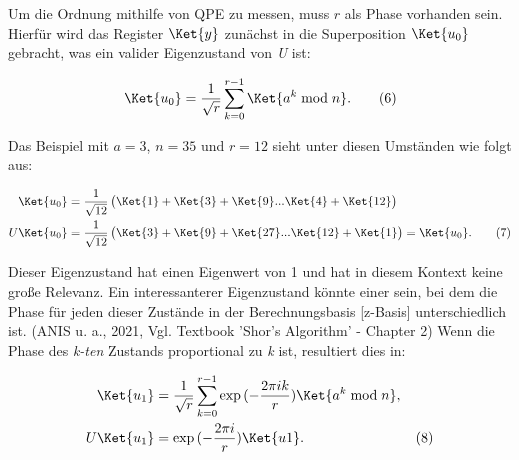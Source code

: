 	\newline \newline
\newline \newline

	Um die Ordnung mithilfe von QPE zu messen, muss \(r\) als Phase vorhanden sein. Hierfür wird das Register \(\Ket{y}\) zunächst in die Superposition \(\Ket{u_0}\) gebracht, was ein valider Eigenzustand von \textit{U} ist:

	\begin{gather*}
	    \Ket{u_0} = \frac{1}{\sqrt{r}} \sum_{k=0}^{r-1} \Ket{a^k \bmod{n}} .  \quad \quad (6)
	\end{gather*}

	Das Beispiel mit \(a=3\), \(n=35\) und \(r=12\) sieht unter diesen Umständen wie folgt aus:

	\begin{align*}
	    \Ket{u_0} &= \frac{1}{\sqrt{12}} \begin{pmatrix}\Ket{1} + \Ket{3} + \Ket{9} ... \Ket{4} + \Ket{12}\end{pmatrix} \\
	    U\Ket{u_0} &= \frac{1}{\sqrt{12}} \begin{pmatrix}\Ket{3} + \Ket{9} + \Ket{27} ... \Ket{12} + \Ket{1}\end{pmatrix} = \Ket{u_0}.  \quad \quad (7)
	\end{align*}


	Dieser Eigenzustand hat einen Eigenwert von 1 und hat in diesem Kontext keine große Relevanz. \glqq Ein interessanterer Eigenzustand könnte einer sein, bei dem die Phase für jeden dieser Zustände in der Berechnungsbasis [z-Basis] unterschiedlich ist. \grqq  (ANIS u. a., 2021, Vgl. Textbook ’Shor’s Algorithm’ - Chapter 2) Wenn die Phase des \textit{k-ten} Zustands proportional zu \textit{k} ist, resultiert dies in:

	\begin{align*}
	    \Ket{u_1} &= \frac{1}{\sqrt{r}} \sum_{k=0}^{r-1} \exp{(-\frac{2\pi i k}{r})} \Ket{a^k \bmod{n}}, \\
	    U\Ket{u_1} &= \exp{(-\frac{2\pi i}{r})}  \Ket{u1}.  \quad \quad \quad \quad \quad \quad \quad \quad (8)
	\end{align*}

